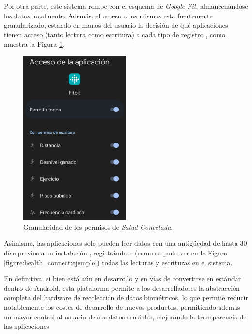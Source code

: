         Por otra parte, este sistema rompe con el esquema de \textit{Google Fit}, almancenándose los datos localmente. Además, el acceso a los mismos esta fuertemente granularizado; estando en manos del usuario la decisión de qué aplicaciones tienen acceso (tanto lectura como escritura) a cada tipo de registro \cite{saez_google_2022}, como muestra la Figura \ref{figure:health_connect:granularidad_permisos}. 

        \begin{figure}[h]
            \centering
            \includegraphics[width=0.5\textwidth]{figures/Health connect permisos fitbit.jpg}
            \caption[Granularidad de los permisos de \textit{Salud Conectada}]
            {Granularidad de los permisos de \textit{Salud Conectada}.}
            \label{figure:health_connect:granularidad_permisos}
        \end{figure}

        
        Asimismo, las aplicaciones solo pueden leer datos con una antigüedad de hasta 30 días previos a su instalación \cite{android_developers_preguntas_nodate}, registrándose (como se pudo ver en la Figura \ref{figure:health_connect:ejemplo}) todas las lecturas y escrituras en el sistema.

        En definitiva, si bien está aún en desarrollo y en vías de convertirse en estándar dentro de Android, esta plataforma permite a los desarrolladores la abstracción completa del hardware de recolección de datos biométricos, lo que permite reducir notablemente los costes de desarrollo de nuevos productos, permitiendo además un mayor control al usuario de sus datos sensibles, mejorando la transparencia de las aplicaciones.

